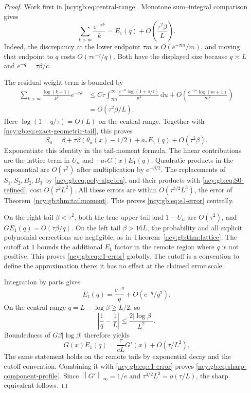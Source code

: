\documentclass[11pt,letterpaper]{article}
\numberwithin{equation}{section}
\theoremstyle{remark}\newtheorem{remark}[theorem]{Remark}
\newcommand{\dd}{\,\mathrm d}
\theoremstyle{definition}\newtheorem{definition}[theorem]{Definition}\theoremstyle{plain}
\newcommand{\norminf}[1]{\left\lVert #1\right\rVert_\infty}
\begin{document}
\begin{proof}
Work first in \eqref{ncy:gb:eq:central-range}. Monotone sum--integral
comparison gives
\begin{equation}\label{ncy:gb:eq:harmonic-tail}
 \sum_{k>m}\frac{e^{-\tau k}}k
 =E_1(q)+O\left(\frac{\tau^2\beta}{L}\right).
\end{equation}
Indeed, the discrepancy at the lower endpoint \(\tau m\) is
\(O(e^{-\tau m}/m)\), and moving that endpoint to \(q\) costs
\(O(\tau e^{-q}/q)\). Both have the displayed size because
\(q\asymp L\) and \(e^{-q}=\tau\beta/c\).

The residual weight term is bounded by
\begin{align*}
 \sum_{k>m}\frac{\log(k+1)}{k^2}e^{-\tau k}
 &\le C\tau\int_{\tau m}^\infty
 \frac{e^{-u}\log(1+u/\tau)}{u^2}\dd u
 +O\left(\frac{e^{-\tau m}\log(m+1)}{m^2}\right)\\
 &=O(\tau^2\beta/L).
\end{align*}
Here \(\log(1+q/\tau)=O(L)\) on the central range.
Together with \eqref{ncy:gb:eq:exact-geometric-tail}, this proves
\begin{equation}\label{ncy:gb:eq:S0-refined}
 S_0=\beta+\tau\beta(\theta_n(x)-1/2)
       +a_*E_1(q)+O(\tau^2\beta).
\end{equation}
Exponentiate this identity in the tail-moment formula.
The linear contributions are the lattice term in \(U_n\) and
\(-a_*G(x)E_1(q)\). Quadratic products in the exponential are
\(O(\tau^2)\) after multiplication by \(e^{-\beta/2}\).
The replacements of \(S_1,S_2,B_2,B_3\) by
\eqref{ncy:gb:eq:poly-algebra}, and their products with
\eqref{ncy:gb:eq:S0-refined}, cost \(O(\tau^2L^2)\).
All these errors are within
\(O(\tau^{3/2}L^3)\), the error of
Theorem~\ref{ncy:gb:thm:tailmoment}. This proves
\eqref{ncy:gb:eq:e1-error} centrally.

On the right tail \(\beta<\tau^2\), both the true upper tail
and \(1-U_n\) are \(O(\tau^2)\), and
\(G E_1(q)=O(\tau\beta/q)\). On the left tail
\(\beta>16L\), the probability and all explicit polynomial
corrections are negligible, as in Theorem~\ref{ncy:gb:thm:lattice}.
The cutoff at \(1\) bounds the additional \(E_1\) factor in the
remote region where \(q\) is not positive. This proves
\eqref{ncy:gb:eq:e1-error} globally. The cutoff is a convention to
define the approximation there; it has no effect at the claimed
error scale.

Integration by parts gives
\[
 E_1(q)=\frac{e^{-q}}q+O(e^{-q}/q^2).
\]
On the central range \(q=L-\log\beta\ge L/2\), so
\[
 \left|\frac1q-\frac1L\right|
 \le \frac{2|\log\beta|}{L^2}.
\]
Boundedness of \(G\beta|\log\beta|\) therefore yields
\[
 G(x)E_1(q)=\frac{\tau}{cL}G'(x)+O(\tau/L^2).
\]
The same statement holds on the remote tails by exponential
decay and the cutoff convention. Combining it with
\eqref{ncy:gb:eq:e1-error} proves
\eqref{ncy:gb:eq:sharp-component-profile}. Since
\(\norminf{G'}=1/e\) and
\(\tau^{3/2}L^3=o(\tau/L)\), the sharp equivalent follows.
\end{proof}
\end{document}
